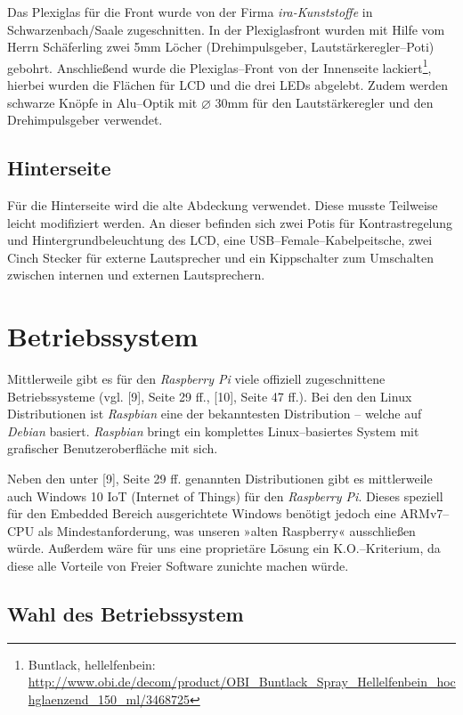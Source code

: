 \documentclass[11pt,ngerman,toc=listof,index=totoc]{scrreprt}
\begin{document}
Das Plexiglas für die Front wurde von der Firma \emph{ira-Kunststoffe}
in Schwarzenbach/Saale zugeschnitten. In der Plexiglasfront wurden mit
Hilfe vom Herrn Schäferling zwei 5mm Löcher (Drehimpulsgeber,
Lautstärkeregler--Poti) gebohrt. Anschließend wurde die Plexiglas--Front
von der Innenseite lackiert\footnote{Buntlack, hellelfenbein:
  \url{http://www.obi.de/decom/product/OBI_Buntlack_Spray_Hellelfenbein_hochglaenzend_150_ml/3468725}},
hierbei wurden die Flächen für LCD und die drei LEDs abgelebt. Zudem
werden schwarze Knöpfe in Alu--Optik mit \(\diameter\) 30mm für den
Lautstärkeregler und den Drehimpulsgeber verwendet.

\subsection{Hinterseite}\label{hinterseite}

Für die Hinterseite wird die alte Abdeckung verwendet. Diese musste
Teilweise leicht modifiziert werden. An dieser befinden sich zwei Potis
für Kontrastregelung und Hintergrundbeleuchtung des LCD, eine
USB--Female--Kabelpeitsche, zwei Cinch Stecker für externe Lautsprecher
und ein Kippschalter zum Umschalten zwischen internen und externen
Lautsprechern.

\section{Betriebssystem}\label{betriebssystem}

Mittlerweile gibt es für den \emph{Raspberry Pi} viele offiziell
zugeschnittene Betriebssysteme (vgl. {[}9{]}, Seite 29 ff., {[}10{]},
Seite 47 ff.). Bei den den Linux Distributionen ist \emph{Raspbian} eine
der bekanntesten Distribution -- welche auf \emph{Debian} basiert.
\emph{Raspbian} bringt ein komplettes Linux--basiertes System mit
grafischer Benutzeroberfläche mit sich.

Neben den unter {[}9{]}, Seite 29 ff. genannten Distributionen gibt es
mittlerweile auch Windows 10 IoT (Internet of Things) für den
\emph{Raspberry Pi}. Dieses speziell für den Embedded Bereich
ausgerichtete Windows benötigt jedoch eine ARMv7--CPU als
Mindestanforderung, was unseren »alten Raspberry« ausschließen würde.
Außerdem wäre für uns eine proprietäre Lösung ein K.O.--Kriterium, da
diese alle Vorteile von Freier Software zunichte machen würde.

\subsection{Wahl des Betriebssystem}\label{wahl-des-betriebssystem}
\end{document}
